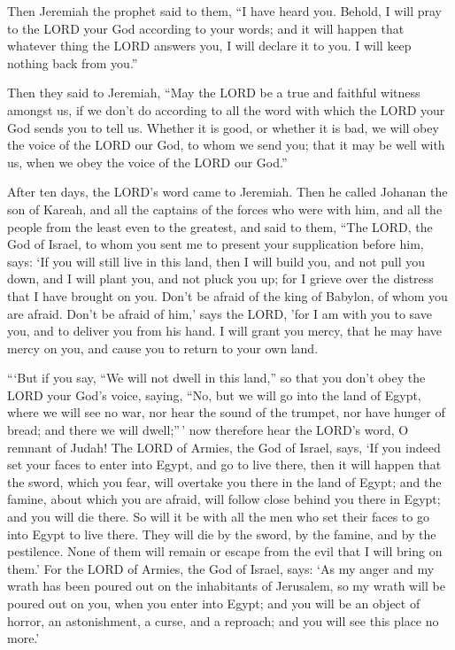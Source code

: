  Then Jeremiah the prophet said to them, ``I have heard
you. Behold, I will pray to the LORD your God according to your words;
and it will happen that whatever thing the LORD answers you, I will
declare it to you. I will keep nothing back from you.''

 Then they said to Jeremiah, ``May the LORD be a true and
faithful witness amongst us, if we don't do according to all the word
with which the LORD your God sends you to tell us. 
Whether it is good, or whether it is bad, we will obey the voice of the
LORD our God, to whom we send you; that it may be well with us, when we
obey the voice of the LORD our God.''

 After ten days, the LORD's word came to Jeremiah.
 Then he called Johanan the son of Kareah, and all the
captains of the forces who were with him, and all the people from the
least even to the greatest,  and said to them, ``The LORD,
the God of Israel, to whom you sent me to present your supplication
before him, says:  `If you will still live in this land,
then I will build you, and not pull you down, and I will plant you, and
not pluck you up; for I grieve over the distress that I have brought on
you.  Don't be afraid of the king of Babylon, of whom you
are afraid. Don't be afraid of him,' says the LORD, 'for I am with you
to save you, and to deliver you from his hand.  I will
grant you mercy, that he may have mercy on you, and cause you to return
to your own land.

 ```But if you say, ``We will not dwell in this land,''
so that you don't obey the LORD your God's voice, 
saying, ``No, but we will go into the land of Egypt, where we will see
no war, nor hear the sound of the trumpet, nor have hunger of bread; and
there we will dwell;''\,'  now therefore hear the LORD's
word, O remnant of Judah! The LORD of Armies, the God of Israel, says,
`If you indeed set your faces to enter into Egypt, and go to live there,
 then it will happen that the sword, which you fear, will
overtake you there in the land of Egypt; and the famine, about which you
are afraid, will follow close behind you there in Egypt; and you will
die there.  So will it be with all the men who set their
faces to go into Egypt to live there. They will die by the sword, by the
famine, and by the pestilence. None of them will remain or escape from
the evil that I will bring on them.'  For the LORD of
Armies, the God of Israel, says: `As my anger and my wrath has been
poured out on the inhabitants of Jerusalem, so my wrath will be poured
out on you, when you enter into Egypt; and you will be an object of
horror, an astonishment, a curse, and a reproach; and you will see this
place no more.'

